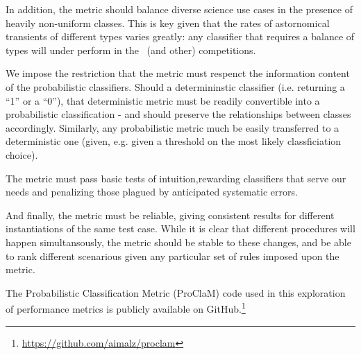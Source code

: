 In addition, the metric should balance diverse science use cases in the presence of heavily non-uniform classes.
This is key given that the rates of astornomical transients of different types varies greatly: any classifier that requires a balance of types will under perform in the \plasticc\ (and other) competitions.

We impose the restriction that the metric must respenct the information content of the probabilistic classifiers.
Should a determininstic classifier (i.e. returning a ``1'' or a ``0''), that deterministic metric must be readily convertible into a probabilistic classification - and should preserve the relationships between classes accordingly.
Similarly, any probabilistic metric much be easily transferred to a deterministic one (given, e.g. given a threshold on the most likely classficiation choice).

The metric must pass basic tests of intuition,rewarding classifiers that serve our needs and penalizing those plagued by anticipated systematic errors.

And finally, the metric must be reliable, giving consistent results for different instantiations of the same test case.
While it is clear that different procedures will happen simultansously, the metric should be stable to these changes, and be able to rank different scenarious given any particular set of rules imposed upon the metric.

The Probabilistic Classification Metric (ProClaM) code used in this exploration of performance metrics is publicly available on GitHub.\footnote{\url{https://github.com/aimalz/proclam}}
